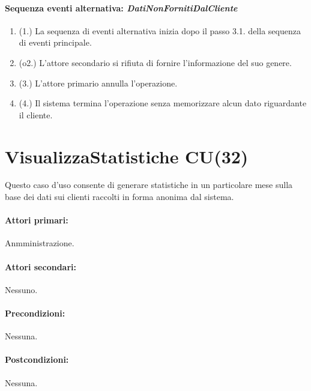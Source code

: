 \documentclass{article}
\begin{document}
	\paragraph{Sequenza eventi alternativa: \emph{DatiNonFornitiDalCliente}}
		\begin{enumerate}[itemsep=8pt,parsep=0pt]
				\item (1.) La sequenza di eventi alternativa inizia dopo il passo 3.1. della sequenza di eventi principale.
				\item (o2.) L'attore secondario si rifiuta di fornire l'informazione del suo genere.
				\item (3.) L'attore primario annulla l'operazione.
				\item (4.) Il sistema termina l'operazione senza memorizzare alcun dato riguardante il cliente.
		\end{enumerate}
	
	


\newpage	
\section*{VisualizzaStatistiche CU(32)}
	
	\indent\indent Questo caso d'uso consente di generare statistiche in un particolare mese sulla base dei dati sui clienti raccolti in forma anonima dal sistema.
	
	\paragraph{Attori primari:}Anmministrazione.
	
	\paragraph{Attori secondari:}Nessuno.
	
	\paragraph{Precondizioni:}Nessuna. %
	
	\paragraph{Postcondizioni:}Nessuna.
	
\end{document}
